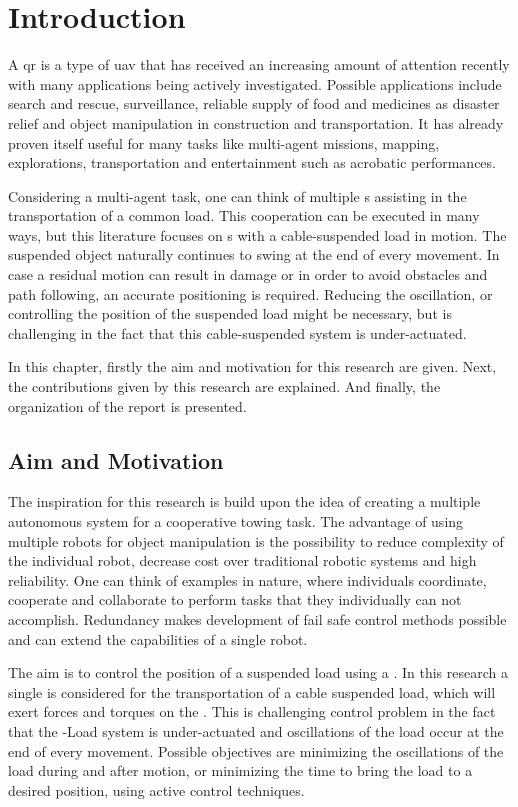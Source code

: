\chapter{Introduction} \label{ch:intro}

A \acf{qr} is a type of \acf{uav} that has received an increasing amount of attention recently with many applications being actively investigated. Possible applications include search and rescue, surveillance, reliable supply of food and medicines as disaster relief and object manipulation in construction and transportation. It has already proven itself useful for many tasks like multi-agent missions, mapping, explorations, transportation and entertainment such as acrobatic performances.

Considering a multi-agent task, one can think of multiple s assisting in the transportation of a common load. This cooperation can be executed in many ways, but this literature focuses on s with a cable-suspended load in motion. The suspended object naturally continues to swing at the end of every movement. In case a residual motion can result in damage or in order to avoid obstacles and path following, an accurate positioning is required. Reducing the oscillation, or controlling the position of the suspended load might be necessary, but is challenging in the fact that this cable-suspended system is under-actuated.

In this chapter, firstly the aim and motivation for this research are given. Next, the contributions given by this research are explained. And finally, the organization of the report is presented.

\section{Aim and Motivation}\label{sec:int.motivation}
The inspiration for this research is build upon the idea of creating a multiple autonomous  system for a cooperative towing task. The advantage of using multiple robots for object manipulation is the possibility to reduce complexity of the individual robot, decrease cost over traditional robotic systems and high reliability. One can think of examples in nature, where individuals coordinate, cooperate and collaborate to perform tasks that they individually can not accomplish. Redundancy makes development of fail safe control methods possible and can extend the capabilities of a single robot. 						

The aim is to control the position of a suspended load using a . In this research a single  is considered for the transportation of a cable suspended load, which will exert forces and torques on the . This is challenging control problem in the fact that the -Load system is under-actuated and oscillations of the load occur at the end of every movement. Possible objectives are minimizing the oscillations of the load during and after motion, or minimizing the time to bring the load to a desired position, using active control techniques.

